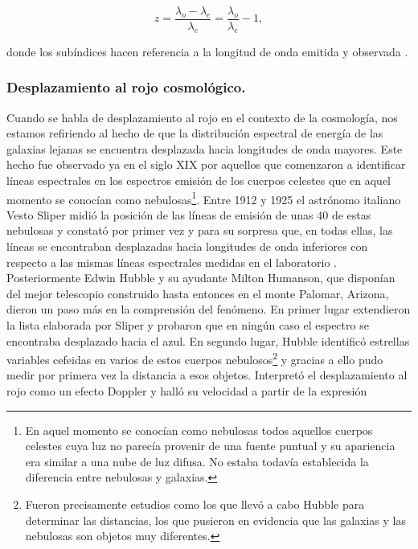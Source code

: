 \begin{equation}\label{eq:z_general}
    z=\frac{\lambda_o-\lambda_e}{\lambda_e}=\frac{\lambda_o}{\lambda_e}-1,
\end{equation}

donde los subíndices hacen referencia a la longitud de onda emitida  y observada .

\subsubsection{Desplazamiento al rojo cosmológico.}

Cuando se habla de desplazamiento al rojo en el contexto de la cosmología, nos estamos refiriendo al hecho de que la distribución espectral de energía de las galaxias lejanas se encuentra desplazada hacia longitudes de onda mayores.  
Este hecho fue observado ya en el siglo XIX por aquellos que comenzaron a identificar líneas espectrales en los espectros emisión de los cuerpos celestes que en aquel momento se conocían como nebulosas\footnote{En aquel momento se conocían como nebulosas todos aquellos cuerpos celestes cuya luz no parecía provenir de una fuente puntual y su apariencia era similar a una nube de luz difusa. No estaba todavía establecida la diferencia entre nebulosas y galaxias.}.  Entre 1912 y 1925 el astrónomo italiano Vesto Sliper midió la posición de las líneas de emisión de unas 40 de estas nebulosas y constató por primer vez y para su sorpresa que, en todas ellas, las líneas se encontraban desplazadas hacia longitudes de onda inferiores con respecto a las mismas líneas espectrales medidas en el laboratorio \citep{book:cosmologia}. 
Posteriormente Edwin Hubble y su ayudante Milton Humanson, que disponían del mejor telescopio construido hasta entonces en el monte Palomar, Arizona, dieron un paso más en la comprensión del fenómeno. En primer lugar extendieron la lista elaborada por Sliper y probaron que en ningún caso el espectro se encontraba desplazado hacia el azul. En segundo lugar, Hubble identificó estrellas variables cefeidas en varios de estos cuerpos nebulosos\footnote{Fueron precisamente estudios como los que llevó a cabo Hubble para determinar las distancias, los que pusieron en evidencia que las galaxias y las nebulosas son objetos muy diferentes.} y gracias a ello pudo medir por primera vez la distancia a esos objetos. Interpretó el desplazamiento al rojo como un efecto Doppler y halló su velocidad a partir de la expresión

\vspace{-5mm}

